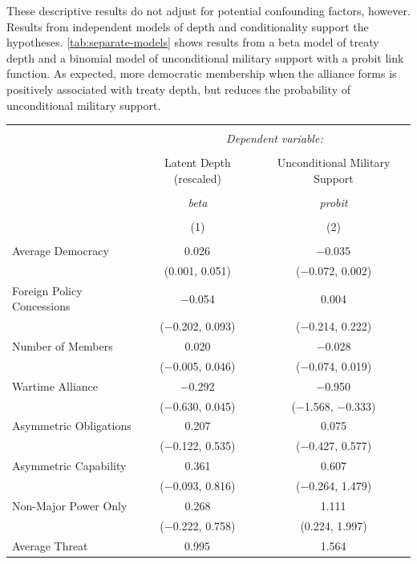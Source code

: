 \documentclass[12pt]{article}
\begin{document}
These descriptive results do not adjust for potential confounding factors, however.
Results from independent models of depth and conditionality support the hypotheses. 
\autoref{tab:separate-models} shows results from a beta model of treaty depth and a binomial model of unconditional military support with a probit link function. 
As expected, more democratic membership when the alliance forms is positively associated with treaty depth, but reduces the probability of unconditional military support. 


\begin{table}[!htbp] \centering 
\begin{tabular}{@{\extracolsep{5pt}}lcc} 
\\[-1.8ex]\hline 
\hline \\[-1.8ex] 
 & \multicolumn{2}{c}{\textit{Dependent variable:}} \\ 
\cline{2-3} 
\\[-1.8ex] & Latent Depth (rescaled) & Unconditional Military Support \\ 
\\[-1.8ex] & \textit{beta} & \textit{probit} \\ 
\\[-1.8ex] & (1) & (2)\\ 
\hline \\[-1.8ex] 
 Average Democracy & 0.026$^{}$ & $-$0.035$^{}$ \\ 
  & (0.001, 0.051) & ($-$0.072, 0.002) \\ 
  Foreign Policy Concessions & $-$0.054 & 0.004 \\ 
  & ($-$0.202, 0.093) & ($-$0.214, 0.222) \\ 
  Number of Members & 0.020 & $-$0.028 \\ 
  & ($-$0.005, 0.046) & ($-$0.074, 0.019) \\ 
  Wartime Alliance & $-$0.292$^{}$ & $-$0.950$^{}$ \\ 
  & ($-$0.630, 0.045) & ($-$1.568, $-$0.333) \\ 
  Asymmetric Obligations & 0.207 & 0.075 \\ 
  & ($-$0.122, 0.535) & ($-$0.427, 0.577) \\ 
  Asymmetric Capability & 0.361 & 0.607 \\ 
  & ($-$0.093, 0.816) & ($-$0.264, 1.479) \\ 
  Non-Major Power Only & 0.268 & 1.111$^{}$ \\ 
  & ($-$0.222, 0.758) & (0.224, 1.997) \\ 
  Average Threat & 0.995$^{}$ & 1.564$^{}$ \\ 

\end{tabular}
\end{table}
\end{document}
